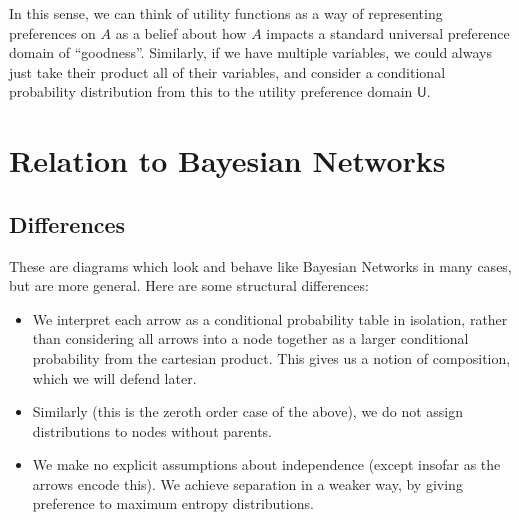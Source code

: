 \documentclass{article}
\begin{document}
	\begin{center}
	\end{center}
	
	In this sense, we can think of utility functions as a way of representing preferences on $A$ as a belief about how $A$ impacts a standard universal preference domain of ``goodness''. Similarly, if we have multiple variables, we could always just take their product all of their variables, and consider a conditional probability distribution from this to the utility preference domain $\mathsf U $.
	
	\begin{center}
	\end{center}

	

	\section{Relation to Bayesian Networks}
	
	\subsection{Differences}
	These are diagrams which look and behave like Bayesian Networks in many cases, but are more general. Here are some structural differences:
	\begin{itemize}[nosep]
		\item We interpret each arrow as a conditional probability table in isolation, rather than considering all arrows into a node together as a larger conditional probability from the cartesian product. This gives us a notion of composition, which we will defend later.
		\item Similarly (this is the zeroth order case of the above), we do not assign distributions to nodes without parents. 
		\item We make no explicit assumptions about independence (except insofar as the arrows encode this). We achieve separation in a weaker way, by giving preference to maximum entropy distributions.
	\end{itemize}
\end{document}
